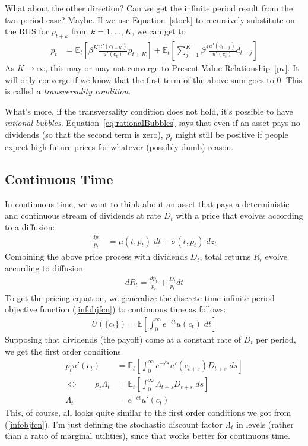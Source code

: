 \documentclass[a4paper,12pt]{scrartcl}
\begin{document}
What about the other direction? Can we get the infinite period result
from the two-period case? Maybe. If we use Equation~\ref{stock} to
recursively substitute on the RHS for $p_{t+k}$ from $k=1,\ldots,K$, we
can get to
\begin{align}
  p_t &=
  \mathbb{E}_t\left[
    \beta^K \frac{u'(c_{t+K})}{u'(c_t)} p_{t+K}
  \right]
  +\mathbb{E}_t\left[
    \sum^K_{j=1}
    \beta^j \frac{u'(c_{t+j})}{u'(c_t)} d_{t+j}
  \right]
  \label{eq:rationalBubbles}
\end{align}
As $K\rightarrow\infty$, this may or may not converge to Present Value
Relationship~\ref{pv}. It will only converge if we know that the first
term of the above sum goes to 0. This is called a \emph{transversality
condition}.

What's more, if the transversality condition does not hold, it's
possible to have \emph{rational bubbles}.
Equation~\ref{eq:rationalBubbles} says that even if an asset pays no
dividends (so that the second term is zero), $p_t$ might still be
positive if people expect high future prices for whatever (possibly
dumb) reason.

\subsection{Continuous Time}

In continuous time, we want to think about an asset that pays a
deterministic and continuous stream of dividends at rate $D_t$ with a
price that evolves according to a diffusion:
\begin{align*}
  \frac{dp_t}{p_t}
  &= \mu(t,p_t)\; dt + \sigma(t,p_t) \;dz_t
\end{align*}
Combining the above price process with dividends $D_t$, total returns
$R_t$ evolve according to diffusion
\begin{align*}
  dR_t = \frac{dp_t}{p_t} + \frac{D_t}{p_t}dt
\end{align*}
To get the pricing equation, we generalize the discrete-time infinite
period objective function (\ref{infobjfcn}) to continuous time as
follows:
\begin{align*}
  U(\{c_t\}) = \mathbb{E}
  \left[\int^\infty_0 e^{-\delta t} u(c_{t}) \; dt\right]
\end{align*}
Supposing that dividends (the payoff) come at a constant rate of $D_t$
per period, we get the first order conditions
\begin{align*}
  p_t u'(c_t)
  &=
  \mathbb{E}_t\left[
  \int^\infty_0 e^{-\delta s} u'(c_{t+s}) D_{t+s} \; ds
  \right] \\
  \Leftrightarrow \qquad
  p_t \Lambda_t
  &=
  \mathbb{E}_t\left[
  \int^\infty_0 \Lambda_{t+s} D_{t+s} \; ds
  \right]\\
  \Lambda_t &= e^{-\delta t}u'(c_t)
\end{align*}
This, of course, all looks quite similar to the first order conditions
we got from (\ref{infobjfcn}). I'm just defining the stochastic discount
factor $\Lambda_t$ in levels (rather than a ratio of marginal
utilities), since that works better for continuous time.
\end{document}

